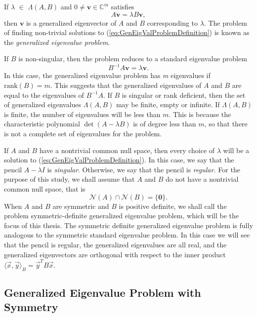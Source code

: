 If $\lambda$ $\in$ $\Lambda(A, B)$ and $0 \neq \mathbf{v} \in \mathbb{C}^m$ satisfies
\begin{equation}\label{eq:GenEigValProblemDefinition}
	A\mathbf{v} = \lambda B\mathbf{v},
\end{equation}
then $\mathbf{v}$ is a generalized eigenvector of $A$ and $B$ corresponding to $\lambda$. The problem of finding non-trivial solutions to (\ref{eq:GenEigValProblemDefinition}) is known as the \textit{generalized eigenvalue problem}.

If $B$ is non-singular, then the problem reduces to a standard eigenvalue problem
\begin{equation}\label{eq:StandardReduction}
	B^{-1}A \mathbf{v} = \lambda \mathbf{v}.
\end{equation}
In this case, the generalized eigenvalue problem has \textit{m} eigenvalues if $\text{rank}(B) = m$. This suggests that the generalized eigenvalues of $A$ and $B$ are equal to the eigenvalues of $B^{-1}A$. If $B$ is singular or rank deficient, then the set of generalized eigenvalues $\Lambda(A, B)$ may be finite, empty or infinite. If $\Lambda(A, B)$ is finite, the number of eigenvalues will be less than $m$. This is because the characteristic polynomial $\det(A- \lambda B)$ is of degree less than $m$, so that there is not a complete set of eigenvalues for the problem.

If $A$ and $B$ have a nontrivial common null space, then every choice of $\lambda$ will be a solution to (\ref{eq:GenEigValProblemDefinition}). In this case, we say that the pencil $A-\lambda I$ is {\em singular}.  Otherwise, we say that the pencil is {\em regular.} For the purpose of this study, we shall assume that $A$ and $B$ do not have a nontrivial common null space, that is
\begin{equation}\label{eq:EmptyCommonNullSpace}
	\mathcal{N}(A) \cap \mathcal{N}(B) = \{\mathbf{0} \}.
\end{equation}
When $A$ and $B$ are symmetric and $B$ is positive definite, we shall call the problem symmetric-definite generalized eigenvalue problem, which will be the focus of this thesis. The symmetric definite generalized eigenvalue problem is fully analogous to the symmetric standard eigenvalue problem.  In this case we will see that the pencil is regular, the generalized eigenvalues are all real, and the generalized eigenvectors are orthogonal with respect to the inner product $\langle\vec{x}, \vec{y}\rangle_B = \vec{y}^T B \vec{x}$.

\subsection{Generalized Eigenvalue Problem with Symmetry}\label{sec:ProblemDiscussion}

